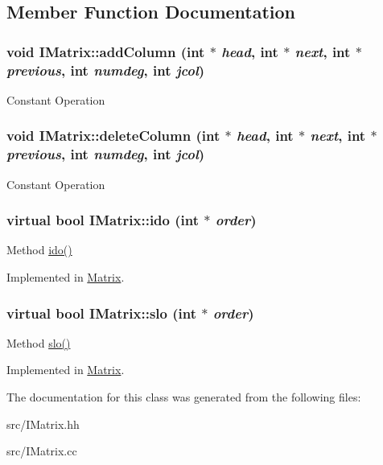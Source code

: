 \subsection{Member Function Documentation}
\hypertarget{classIMatrix_adfe1c1b95399cadb8d07a17d10ea6118}{
\subsubsection[{addColumn}]{\setlength{\rightskip}{0pt plus 5cm}void IMatrix::addColumn (int $\ast$ {\em head}, \/  int $\ast$ {\em next}, \/  int $\ast$ {\em previous}, \/  int {\em numdeg}, \/  int {\em jcol})}}
\label{classIMatrix_adfe1c1b95399cadb8d07a17d10ea6118}
Constant Operation \hypertarget{classIMatrix_adef00da9cba0f17ec0d64d688a3ebc58}{
\subsubsection[{deleteColumn}]{\setlength{\rightskip}{0pt plus 5cm}void IMatrix::deleteColumn (int $\ast$ {\em head}, \/  int $\ast$ {\em next}, \/  int $\ast$ {\em previous}, \/  int {\em numdeg}, \/  int {\em jcol})}}
\label{classIMatrix_adef00da9cba0f17ec0d64d688a3ebc58}
Constant Operation \hypertarget{classIMatrix_a8e0f3a1062786b6a20548e847de1109b}{
\subsubsection[{ido}]{\setlength{\rightskip}{0pt plus 5cm}virtual bool IMatrix::ido (int $\ast$ {\em order})}}
\label{classIMatrix_a8e0f3a1062786b6a20548e847de1109b}
Method \hyperlink{classIMatrix_a8e0f3a1062786b6a20548e847de1109b}{ido()} 

Implemented in \hyperlink{classMatrix_ab9bef57c1115e601cdeb493ecb381b82}{Matrix}.\hypertarget{classIMatrix_ad6d689b7a38120b6463f1965915f7163}{
\subsubsection[{slo}]{\setlength{\rightskip}{0pt plus 5cm}virtual bool IMatrix::slo (int $\ast$ {\em order})}}
\label{classIMatrix_ad6d689b7a38120b6463f1965915f7163}
Method \hyperlink{classIMatrix_ad6d689b7a38120b6463f1965915f7163}{slo()} 

Implemented in \hyperlink{classMatrix_ac7e287f032e1296c51ce29704a0af704}{Matrix}.

The documentation for this class was generated from the following files:\begin{DoxyCompactItemize}
\item 
src/IMatrix.hh\item 
src/IMatrix.cc\end{DoxyCompactItemize}
